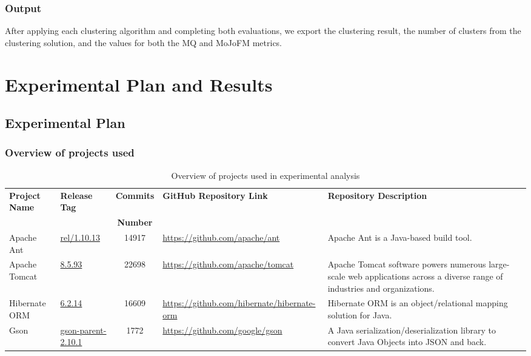 \documentclass{ieeeaccess}
\begin{document}
\subsubsection{Output}

After applying each clustering algorithm and completing both evaluations, we export the clustering result, the number of clusters from the clustering solution, and the values for both the MQ and MoJoFM metrics.



\section{Experimental Plan and Results}
\label{sec:experiment}


\subsection{Experimental Plan}
\label{subsec:plan}

\subsubsection{Overview of projects used}

\begin{table}
\centering
\caption{Overview of projects used in experimental analysis}
\label{tab:project_info}
\setlength{\tabcolsep}{7pt} 
\begin{tabular}{|l|l|c|l|p{4.7cm}|}
\hline
\textbf{Project Name} & \textbf{Release Tag} & \textbf{Commits} & \textbf{GitHub Repository Link} & \textbf{Repository Description} \\ 
 &  & \textbf{Number} & &  \\ \hline
Apache Ant & \href{https://github.com/apache/ant/tree/rel/1.10.13}{rel/1.10.13} & 14917 & \href{https://github.com/apache/ant}{https://github.com/apache/ant} & Apache Ant is a Java-based build tool. \\ \hline
Apache Tomcat & \href{https://github.com/apache/tomcat/tree/8.5.93}{8.5.93} & 22698 & \href{https://github.com/apache/tomcat}{https://github.com/apache/tomcat} & Apache Tomcat software powers numerous large-scale web applications across a diverse range of industries and organizations. \\ \hline
Hibernate ORM & \href{https://github.com/hibernate/hibernate-orm/tree/6.2.14}{6.2.14} & 16609 & \href{https://github.com/hibernate/hibernate-orm}{https://github.com/hibernate/hibernate-orm} & Hibernate ORM is an object/relational mapping solution for Java. \\ \hline
Gson & \href{https://github.com/google/gson/tree/gson-parent-2.10.1}{gson-parent-2.10.1} & 1772 & \href{https://github.com/google/gson}{https://github.com/google/gson} & A Java serialization/deserialization library to convert Java Objects into JSON and back. \\ \hline
\end{tabular}
\end{table}
\end{document}
